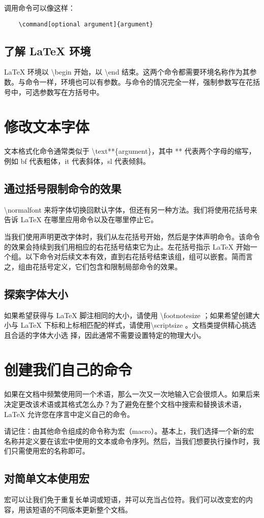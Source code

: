 调用命令可以像这样：

\begin{verbatim}
    \command[optional argument]{argument}
\end{verbatim}
\subsection{了解 {\LaTeX} 环境}
{\LaTeX} 环境以 \textbackslash begin 开始，以 \textbackslash end 结束。这两个命令都需要环境名称作为其参数。与命令一样，环境也可以有参数。与命令的情况完全一样，强制参数写在花括号中，可选参数写在方括号中。
\section{修改文本字体}
文本格式化命令通常类似于 \textbackslash text**\{argument\}，其中 ** 代表两个字母的缩写，例如 bf 代表粗体，it 代表斜体，sl 代表倾斜。
\subsection{通过括号限制命令的效果}
\textbackslash normalfont 来将字体切换回默认字体，但还有另一种方法。我们将使用花括号来告诉 {\LaTeX} 在哪里应用命令以及在哪里停止它。

当我们使用声明更改字体时，我们从左花括号开始，然后是字体声明命令。该命令的效果会持续到我们用相应的右花括号结束它为止。左花括号指示 {\LaTeX} 开始一个组。以下命令对后续文本有效，直到右花括号结束该组，组可以嵌套。简而言之，组由花括号定义，它们包含和限制局部命令的效果。

\subsection{探索字体大小}
如果希望获得与 {\LaTeX} 脚注相同的大小，请使用 \textbackslash footnotesize ；如果希望创建大小与
{\LaTeX} 下标和上标相匹配的样式，请使用\textbackslash scriptsize 。文档类提供精心挑选且合适的字体大小选
择，因此通常不需要设置特定的物理大小。

\section{创建我们自己的命令}
如果在文档中频繁使用同一个术语，那么一次又一次地输入它会很烦人。如果后来决定更改该术语或其格式怎么办？为了避免在整个文档中搜索和替换该术语，{\LaTeX} 允许您在序言中定义自己的命令。

请记住：由其他命令组成的命令称为宏（macro）。基本上，我们选择一个新的宏名称并定义要在该宏中使用的文本或命令序列。然后，当我们想要执行操作时，我们只需使用宏的名称即可。
\subsection{对简单文本使用宏}
宏可以让我们免于重复长单词或短语，并可以充当占位符。我们可以改变宏的内容，用该短语的不同版本更新整个文档。